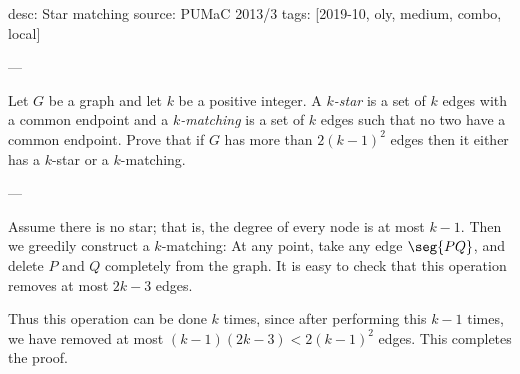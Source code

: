 desc: Star matching
source: PUMaC 2013/3
tags: [2019-10, oly, medium, combo, local]

---

Let $G$ be a graph and let $k$ be a positive integer. A \emph{$k$-star} is a set of $k$ edges with a common endpoint and a \emph{$k$-matching} is a set of $k$ edges such that no two have a common endpoint. Prove that if $G$ has more than $2(k-1)^2$ edges then it either has a $k$-star or a $k$-matching.

---

Assume there is no star; that is, the degree of every node is at most $k-1$. Then we greedily construct a $k$-matching: At any point, take any edge $\seg{PQ}$, and delete $P$ and $Q$ completely from the graph. It is easy to check that this operation removes at most $2k-3$ edges.

Thus this operation can be done $k$ times, since after performing this $k-1$ times, we have removed at most $(k-1)(2k-3)<2(k-1)^2$ edges. This completes the proof.
